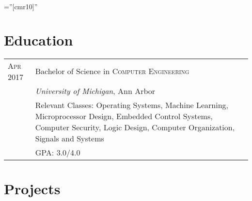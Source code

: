 \documentclass[a4paper,12pt]{article} %
\begin{document}
\pagestyle{empty} %

\font\fb=''[cmr10]'' %


\par{\par} %
\par{\par}


\section{Education}

\begin{tabular}{R{2.1cm}|p{15.5cm}}
\hspace{4pt}\textsc{Apr} 2017 & Bachelor of Science in \textsc{Computer Engineering} \\
& \normalsize\emph{University of Michigan}, Ann Arbor \\
& \footnotesize{Relevant Classes: Operating Systems, Machine Learning,
  Microprocessor Design, Embedded Control Systems, Computer Security,
  Logic Design, Computer Organization, Signals and Systems}\\
& \footnotesize{GPA: 3.0/4.0} \\
\end{tabular}


\section{Projects}
\end{document}
